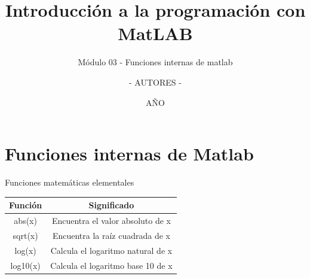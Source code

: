 \documentclass{bredelebeamer}
\title[Programación en MatLAB]{Introducción a la programación con MatLAB}
\subtitle{Módulo 03 - Funciones internas de matlab}
\author{- AUTORES - \inst{1}}
\institute[UNIVERSIDAD]
{
  \inst{1}%
  - NOMBRE UNIVERSIDAD - 
  }
\date{AÑO}
\begin{document}
\begin{frame}
  \titlepage 
\end{frame}




\section{Funciones internas de Matlab}

\begin{frame}{Funciones matemáticas elementales}
\begin{table}[]
\centering
\begin{tabular}{|c|c|}
\hline
Función  & Significado                       \\ \hline
abs(x)   & Encuentra el valor absoluto de x  \\ \hline
sqrt(x)  & Encuentra la raíz cuadrada de x   \\ \hline
log(x)   & Calcula el logaritmo natural de x \\ \hline
log10(x) & Calcula el logaritmo base 10 de x \\ \hline
\end{tabular}
\end{table}
\end{frame}
\end{document}
